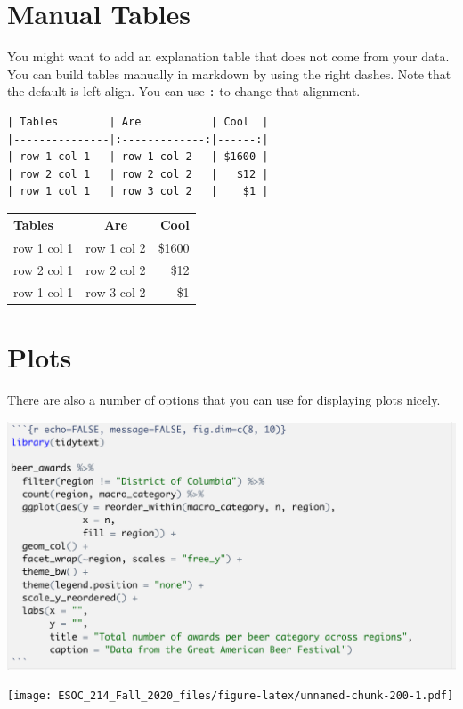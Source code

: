 \documentclass[
]{book}
\begin{document}
\hypertarget{manual-tables}{%
\section{Manual Tables}\label{manual-tables}}

You might want to add an explanation table that does not come from your data. You can build tables manually in markdown by using the right dashes. Note that the default is left align. You can use \texttt{:} to change that alignment.

\begin{verbatim}
| Tables        | Are           | Cool  |
|---------------|:-------------:|------:|
| row 1 col 1   | row 1 col 2   | $1600 |
| row 2 col 1   | row 2 col 2   |   $12 |
| row 1 col 1   | row 3 col 2   |    $1 |
\end{verbatim}

\begin{longtable}[]{@{}lcr@{}}
\toprule
Tables & Are & Cool\tabularnewline
\midrule
\endhead
row 1 col 1 & row 1 col 2 & \$1600\tabularnewline
row 2 col 1 & row 2 col 2 & \$12\tabularnewline
row 1 col 1 & row 3 col 2 & \$1\tabularnewline
\bottomrule
\end{longtable}

\hypertarget{plots}{%
\section{Plots}\label{plots}}

There are also a number of options that you can use for displaying plots nicely.

\includegraphics[width=20.39in]{images/nice_plot}

\texttt{[image: ESOC\_214\_Fall\_2020\_files/figure-latex/unnamed-chunk-200-1.pdf]}
\end{document}
